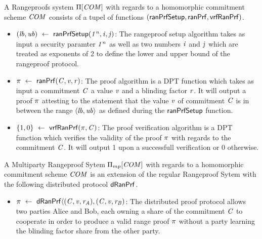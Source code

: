 \begin{definition}
    A Rangeproofs system $\Pi[\mathit{COM}]$ with regards to a homomorphic commitment scheme $\mathit{COM}$ consists of a tupel of functions $(\mathsf{ranPrfSetup}, \mathsf{ranPrf}, \mathsf{vrfRanPrf})$.
    \begin{itemize}
        \item $(\mathit{lb},\mathit{ub}) ~\leftarrow~ \mathsf{ranPrfSetup}(\mathit{1^n},\mathit{i},\mathit{j})$: The rangeproof setup algorithm takes as input a security paramter $\mathit{1^n}$ as well as two numbers
        $\mathit{i}$ and $\mathit{j}$ which are treated as exponents of 2 to define the lower and upper bound of the rangeproof protocol.
        \item $\pi ~\leftarrow~ \mathsf{ranPrf}(\mathit{C},\mathit{v},\mathit{r})$: The proof algorithm is a DPT function which takes as input a commitment $\mathit{C}$ a value $\mathit{v}$ and
        a blinding factor $\mathit{r}$. It will output a proof $\pi$ attesting to the statement that the value $\mathit{v}$ of commitment $\mathit{C}$ is in between the range $\langle \mathit{lb}, \mathit{ub} \rangle$ as
        defined during the $\mathsf{ranPrfSetup}$ function.
        \item $\{1,0\} ~\leftarrow~ \mathsf{vrfRanPrf}(\pi,\mathit{C})$: The proof verification algorithm is a DPT function which verifies the validity of the proof $\pi$ with regards to the commitment
        $\mathit{C}$. It will output 1 upon a successfull verification or 0 otherwise.
    \end{itemize}
\end{definition}

\begin{definition}
    A Multiparty Rangeproof Sytem $\Pi_{mp}[\mathit{COM}]$ with regards to a homomorphic commitment scheme $\mathit{COM}$ is an extension of the regular Rangeproof Sytem with the following
    distributed protocol $\mathsf{dRanPrf}$.
    \begin{itemize}
        \item $\pi ~\leftarrow~ \mathsf{dRanPrf} \langle(\mathit{C},\mathit{v},\mathit{r}_{\mathit{A}}),(\mathit{C},\mathit{v},\mathit{r}_{\mathit{B}})$: The distributed proof protocol allows two parties Alice and Bob, each owning a share of the
        commitment $\mathit{C}$ to cooperate in order to produce a valid range proof $\pi$ without a party learning the blinding factor share from the other party.
    \end{itemize}
\end{definition}

